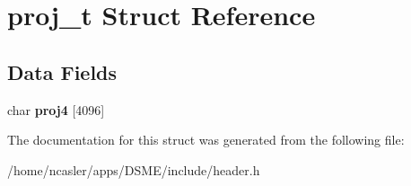 \hypertarget{structproj__t}{}\section{proj\+\_\+t Struct Reference}
\label{structproj__t}
\subsection*{Data Fields}
\begin{DoxyCompactItemize}
\item 
\hypertarget{structproj__t_afc1a5828cd65f6831fe6952bbe751fe2}{}char {\bfseries proj4} \mbox{[}4096\mbox{]}\label{structproj__t_afc1a5828cd65f6831fe6952bbe751fe2}

\end{DoxyCompactItemize}


The documentation for this struct was generated from the following file\+:\begin{DoxyCompactItemize}
\item 
/home/ncasler/apps/\+D\+S\+M\+E/include/header.\+h\end{DoxyCompactItemize}
